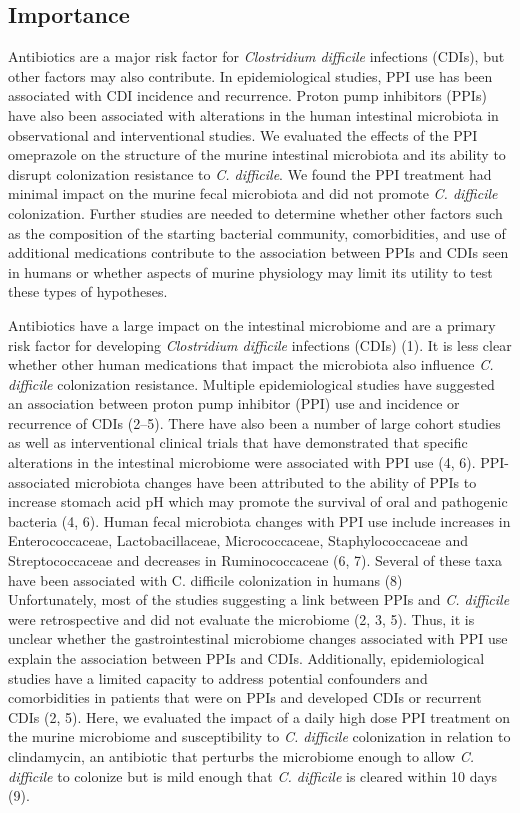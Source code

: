 \documentclass[11pt,]{article}
\begin{document}
\subsection{Importance}\label{importance}

Antibiotics are a major risk factor for \emph{Clostridium difficile}
infections (CDIs), but other factors may also contribute. In
epidemiological studies, PPI use has been associated with CDI incidence
and recurrence. Proton pump inhibitors (PPIs) have also been associated
with alterations in the human intestinal microbiota in observational and
interventional studies. We evaluated the effects of the PPI omeprazole
on the structure of the murine intestinal microbiota and its ability to
disrupt colonization resistance to \emph{C. difficile}. We found the PPI
treatment had minimal impact on the murine fecal microbiota and did not
promote \emph{C. difficile} colonization. Further studies are needed to
determine whether other factors such as the composition of the starting
bacterial community, comorbidities, and use of additional medications
contribute to the association between PPIs and CDIs seen in humans or
whether aspects of murine physiology may limit its utility to test these
types of hypotheses.

\newpage

Antibiotics have a large impact on the intestinal microbiome and are a
primary risk factor for developing \emph{Clostridium difficile}
infections (CDIs) (1). It is less clear whether other human medications
that impact the microbiota also influence \emph{C. difficile}
colonization resistance. Multiple epidemiological studies have suggested
an association between proton pump inhibitor (PPI) use and incidence or
recurrence of CDIs (2--5). There have also been a number of large cohort
studies as well as interventional clinical trials that have demonstrated
that specific alterations in the intestinal microbiome were associated
with PPI use (4, 6). PPI-associated microbiota changes have been
attributed to the ability of PPIs to increase stomach acid pH which may
promote the survival of oral and pathogenic bacteria (4, 6). Human fecal
microbiota changes with PPI use include increases in Enterococcaceae,
Lactobacillaceae, Micrococcaceae, Staphylococcaceae and Streptococcaceae
and decreases in Ruminococcaceae (6, 7). Several of these taxa have been
associated with C. difficile colonization in humans (8)\\
Unfortunately, most of the studies suggesting a link between PPIs and
\emph{C. difficile} were retrospective and did not evaluate the
microbiome (2, 3, 5). Thus, it is unclear whether the gastrointestinal
microbiome changes associated with PPI use explain the association
between PPIs and CDIs. Additionally, epidemiological studies have a
limited capacity to address potential confounders and comorbidities in
patients that were on PPIs and developed CDIs or recurrent CDIs (2, 5).
Here, we evaluated the impact of a daily high dose PPI treatment on the
murine microbiome and susceptibility to \emph{C. difficile} colonization
in relation to clindamycin, an antibiotic that perturbs the microbiome
enough to allow \emph{C. difficile} to colonize but is mild enough that
\emph{C. difficile} is cleared within 10 days (9).
\end{document}
